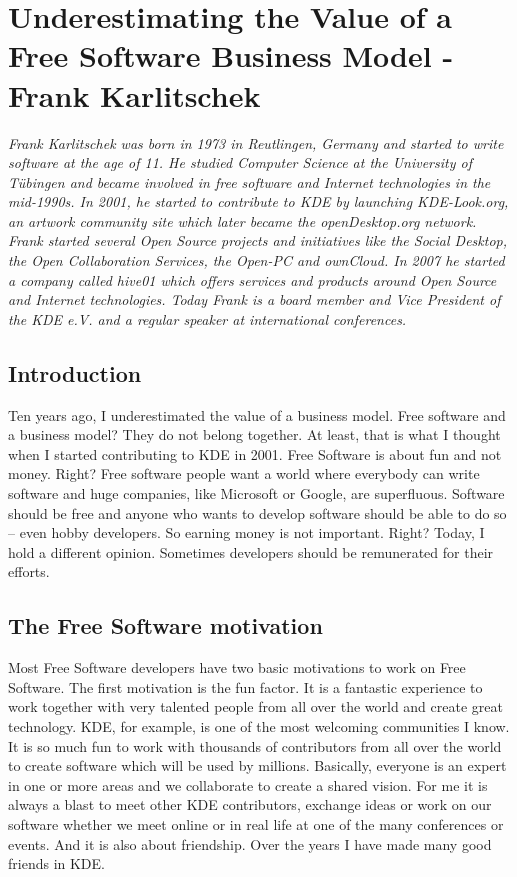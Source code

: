 \chapter{Underestimating the Value of a Free Software Business Model - Frank Karlitschek}

\textit{Frank Karlitschek was born in 1973 in Reutlingen, Germany and started to
write software at the age of 11. He studied Computer Science at the University
of T\"ubingen and became involved in free software and Internet technologies in
the mid-1990s. In 2001, he started to contribute to KDE by launching KDE-Look.org,
an artwork community site which later became the openDesktop.org network. Frank
started several Open Source projects and initiatives like the Social Desktop,
the Open Collaboration Services, the Open-PC and ownCloud. In 2007 he started a
company called hive01 which offers services and products around Open Source and
Internet technologies.
Today Frank is a board member and Vice President of the KDE e.V. and a regular
speaker at international conferences.}

\section*{Introduction}

Ten years ago, I underestimated the value of a business model. Free software and
a business model? They do not belong together. At least, that is what I thought
when I started contributing to KDE in 2001. Free Software is about fun and not
money. Right? Free software people want a world where everybody can write
software and huge companies, like Microsoft or Google, are superfluous. Software
should be free and anyone who wants to develop software should be able to do so
-- even hobby developers. So earning money is not important. Right? Today, I
hold a different opinion. Sometimes developers should be remunerated for their
efforts.  

\section*{The Free Software motivation}

Most Free Software developers have two basic motivations to work on Free
Software. The first motivation is the fun factor. It is a fantastic experience
to work together with very talented people from all over the world and create
great technology. KDE, for example, is one of the most welcoming communities I
know. It is so much fun to work with thousands of contributors from all over the
world to create software which will be used by millions. Basically, everyone is
an expert in one or more areas and we collaborate to create a shared vision. For
me it is always a blast to meet other KDE contributors, exchange ideas or work
on our software whether we meet online or in real life at one of the many
conferences or events. And it is also about friendship. Over the years I have
made many good friends in KDE.

